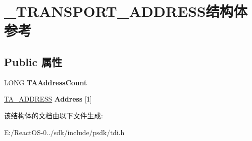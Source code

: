 \hypertarget{struct___t_r_a_n_s_p_o_r_t___a_d_d_r_e_s_s}{}\section{\+\_\+\+T\+R\+A\+N\+S\+P\+O\+R\+T\+\_\+\+A\+D\+D\+R\+E\+S\+S结构体 参考}
\label{struct___t_r_a_n_s_p_o_r_t___a_d_d_r_e_s_s}
\subsection*{Public 属性}
\begin{DoxyCompactItemize}
\item 
\mbox{\label{struct___t_r_a_n_s_p_o_r_t___a_d_d_r_e_s_s_ac5559c7218f98d046b16e06dc9341253}} 
L\+O\+NG {\bfseries T\+A\+Address\+Count}
\item 
\mbox{\label{struct___t_r_a_n_s_p_o_r_t___a_d_d_r_e_s_s_a19698ef94da6ba90c1f160eea75a8238}} 
\hyperlink{struct___t_a___a_d_d_r_e_s_s}{T\+A\+\_\+\+A\+D\+D\+R\+E\+SS} {\bfseries Address} \mbox{[}1\mbox{]}
\end{DoxyCompactItemize}


该结构体的文档由以下文件生成\+:\begin{DoxyCompactItemize}
\item 
E\+:/\+React\+O\+S-\/0../sdk/include/psdk/tdi.\+h\end{DoxyCompactItemize}
